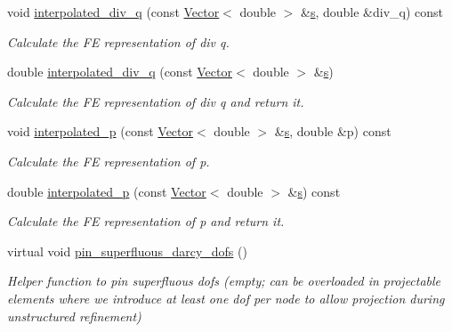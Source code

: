 \begin{DoxyCompactItemize}
void \hyperlink{classoomph_1_1DarcyEquations_ab9f255825c7bc27d042b936757960f7a}{interpolated\+\_\+div\+\_\+q} (const \hyperlink{classoomph_1_1Vector}{Vector}$<$ double $>$ \&\hyperlink{cfortran_8h_ab7123126e4885ef647dd9c6e3807a21c}{s}, double \&div\+\_\+q) const
\begin{DoxyCompactList}\small\item\em Calculate the FE representation of div q. \end{DoxyCompactList}\item 
double \hyperlink{classoomph_1_1DarcyEquations_a1a01360c1c30124f862f85c411afa016}{interpolated\+\_\+div\+\_\+q} (const \hyperlink{classoomph_1_1Vector}{Vector}$<$ double $>$ \&\hyperlink{cfortran_8h_ab7123126e4885ef647dd9c6e3807a21c}{s})
\begin{DoxyCompactList}\small\item\em Calculate the FE representation of div q and return it. \end{DoxyCompactList}\item 
void \hyperlink{classoomph_1_1DarcyEquations_a800717c69f8a472d98ad0d9714a9598b}{interpolated\+\_\+p} (const \hyperlink{classoomph_1_1Vector}{Vector}$<$ double $>$ \&\hyperlink{cfortran_8h_ab7123126e4885ef647dd9c6e3807a21c}{s}, double \&p) const
\begin{DoxyCompactList}\small\item\em Calculate the FE representation of p. \end{DoxyCompactList}\item 
double \hyperlink{classoomph_1_1DarcyEquations_a564a225d0e00cf5923ef725b73a68fda}{interpolated\+\_\+p} (const \hyperlink{classoomph_1_1Vector}{Vector}$<$ double $>$ \&\hyperlink{cfortran_8h_ab7123126e4885ef647dd9c6e3807a21c}{s}) const
\begin{DoxyCompactList}\small\item\em Calculate the FE representation of p and return it. \end{DoxyCompactList}\item 
virtual void \hyperlink{classoomph_1_1DarcyEquations_a7a98829567782b4973208317ab7bcd50}{pin\+\_\+superfluous\+\_\+darcy\+\_\+dofs} ()
\begin{DoxyCompactList}\small\item\em Helper function to pin superfluous dofs (empty; can be overloaded in projectable elements where we introduce at least one dof per node to allow projection during unstructured refinement) \end{DoxyCompactList}\item 

\end{DoxyCompactItemize}
